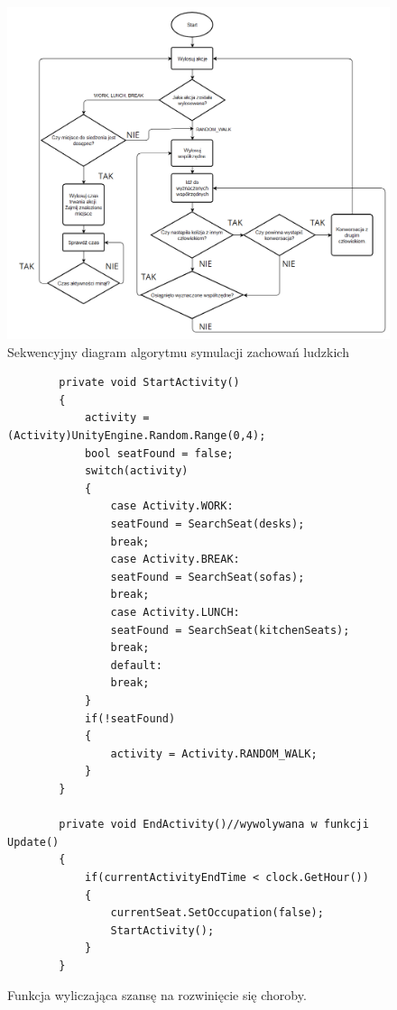 \begin{figure}[h!]
	\includegraphics[width=\linewidth]{DiagramAlgorytmuZachowania.png}
	\caption{Sekwencyjny diagram algorytmu symulacji zachowań ludzkich}
	\label{diagramZachowanie}
\end{figure}


\begin{figure}
	\centering
	\begin{lstlisting}
		private void StartActivity()
		{
			activity = (Activity)UnityEngine.Random.Range(0,4);
			bool seatFound = false;
			switch(activity)
			{
				case Activity.WORK:
				seatFound = SearchSeat(desks);
				break;
				case Activity.BREAK:
				seatFound = SearchSeat(sofas);
				break;
				case Activity.LUNCH:
				seatFound = SearchSeat(kitchenSeats);
				break;
				default:
				break;
			}
			if(!seatFound)
			{
				activity = Activity.RANDOM_WALK;
			}
		}
		
		private void EndActivity()//wywolywana w funkcji Update()
		{
			if(currentActivityEndTime < clock.GetHour())
			{
				currentSeat.SetOccupation(false);
				StartActivity();
			}
		}
	\end{lstlisting}
	\caption{Funkcja wyliczająca szansę na rozwinięcie się choroby.}
	\label{fig:kod:Activity}
\end{figure}




